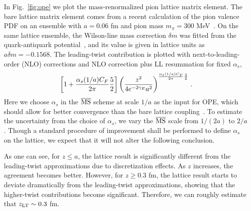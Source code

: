 \documentclass[preprint,12pt]{elsarticle}
\newcommand{\MS}{{\overline{\rm MS}}}
\DeclareRobustCommand{\fig}[1]{Fig.~\ref{fig:#1}}
\begin{document}
In \fig{ope} we plot the mass-renormalized pion lattice matrix element. The bare lattice matrix element comes from a recent calculation of the pion valence PDF on an ensemble with $a=0.06$ fm and pion mass $m_\pi=300$ MeV~\cite{Gao:2020ito}. On the same lattice ensemble, the Wilson-line mass correction $\delta m$ was fitted from the quark-antiquark potential~\cite{Izubuchi:2019lyk}, and its value is given in lattice units as $a \delta m = -0.1568$. The leading-twist contribution is plotted with next-to-leading-order (NLO) corrections and NLO correction plus LL resummation for fixed $\alpha_s$,
\begin{align}
	\left[ 1 + {\alpha_s(1/a)C_F\over 2\pi}  {5\over2}\right]\left({z^2\over 4e^{-2\gamma_E}a^2}\right)^{{\alpha_s(1/a)C_F\over 2\pi}{3\over 2}}\,.
\end{align}
Here we choose $\alpha_s$ in the $\MS$ scheme at scale $1/a$ as the input for OPE, which should allow for better convergence than the bare lattice coupling~\cite{Lepage:1992xa}. To estimate the uncertainty from the choice of $\alpha_s$, we vary the $\MS$ scale from $1/(2a)$ to $2/a$. Though a standard procedure of improvement shall be performed to define $\alpha_s$ on the lattice, we expect that it will not alter the following conclusion.

As one can see, for $z\le a$, the lattice result is significantly different from the leading-twist approximations due to discretization effects. As $z$ increases, the agreement becomes better. However, for $z\ge 0.3$ fm, the lattice result starts to deviate dramatically from the leading-twist approximations, showing that the higher-twist contributions become significant. Therefore, we can roughly estimate that $z_{\rm LT}\sim 0.3$ fm.
	
\end{document}
